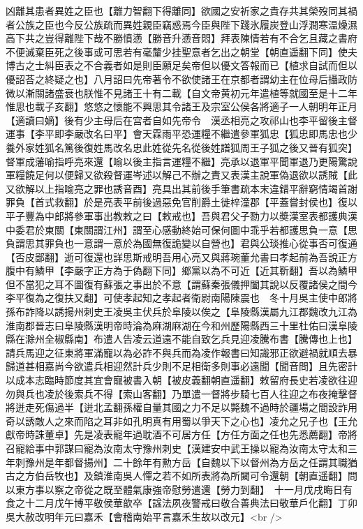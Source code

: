 凶離其患者異姓之臣也【離力智翻下得離同】欲國之安祈家之貴存共其榮歿同其禍者公族之臣也今反公族疏而異姓親臣竊惑焉今臣與陛下踐氷履炭登山浮澗寒温燥濕高下共之豈得離陛下哉不勝憤懣【勝音升懣音悶】拜表陳情若有不合乞且藏之書府不便滅棄臣死之後事或可思若有毫釐少挂聖意者乞出之朝堂【朝直遥翻下同】使夫博古之士糾臣表之不合義者如是則臣願足矣帝但以優文答報而已【植求自試而但以優詔荅之終疑之也】八月詔曰先帝著令不欲使諸王在京都者謂幼主在位母后攝政防微以漸關諸盛衰也朕惟不見諸王十有二載【自文帝黄初元年遣植等就國至是十二年惟思也載子亥翻】悠悠之懷能不興思其令諸王及宗室公侯各將適子一人朝明年正月【適讀曰嫡】後有少主母后在宫者自如先帝令　漢丞相亮之攻祁山也李平留後主督運事【李平即李嚴改名曰平】會天霖雨平恐運糧不繼遣參軍狐忠【狐忠即馬忠也少養外家姓狐名篤後復姓馬改名忠此姓從先名從後姓譜狐周王子狐之後又晉有狐突】督軍成藩喻指呼亮來還【喻以後主指言運糧不繼】亮承以退軍平聞軍退乃更陽驚說軍糧饒足何以便歸又欲殺督運岑述以解己不辦之責又表漢主說軍偽退欲以誘賊【此又欲解以上指喻亮之罪也誘音酉】亮具出其前後手筆書疏本末違錯平辭窮情竭首謝罪負【首式救翻】於是亮表平前後過惡免官削爵土徙梓潼郡【平蓋嘗封侯也】復以平子豐為中郎將參軍事出教敕之曰【敕戒也】吾與君父子勠力以奬漢室表都護典漢中委君於東關【東關謂江州】謂至心感動終始可保何圖中乖乎若都護思負一意【思負謂思其罪負也一意謂一意於為國無復詭變以自營也】君與公琰推心從事否可復通【否皮鄙翻】逝可復還也詳思斯戒明吾用心亮又與蔣琬董允書曰孝起前為吾說正方腹中有鱗甲【李嚴字正方為于偽翻下同】鄉黨以為不可近【近其靳翻】吾以為鱗甲但不當犯之耳不圖復有蘇張之事出於不意【謂蘇秦張儀押闔其說以反覆諸侯之間今李平復為之復扶又翻】可使孝起知之孝起者衛尉南陽陳震也　冬十月吳主使中郎將孫布詐降以誘揚州刺史王凌吳主伏兵於阜陵以俟之【阜陵縣漢屬九江郡魏改九江為淮南郡晉志曰阜陵縣漢明帝時淪為麻湖麻湖在今和州歷陽縣西三十里杜佑曰漢阜陵縣在滁州全椒縣南】布遣人告凌云道遠不能自致乞兵見迎凌騰布書【騰傳也上也】請兵馬迎之征東將軍滿寵以為必詐不與兵而為凌作報書曰知識邪正欲避禍就順去暴歸道甚相嘉尚今欲遣兵相迎然計兵少則不足相衛多則事必遠聞【聞音問】且先密計以成本志臨時節度其宜會寵被書入朝【被皮義翻朝直遥翻】敕留府長史若凌欲往迎勿與兵也凌於後索兵不得【索山客翻】乃單遣一督將步騎七百人往迎之布夜掩擊督將迸走死傷過半【迸北孟翻孫權自量其國之力不足以斃魏不過時於疆場之間設詐用奇以誘敵人之來而陷之耳非如孔明真有用蜀以爭天下之心也】凌允之兄子也【王允獻帝時誅董卓】先是凌表寵年過耽酒不可居方任【方任方面之任也先悉薦翻】帝將召寵給事中郭謀曰寵為汝南太守豫州刺史【漢建安中武王操以寵為汝南太守太和三年刺豫州是年都督揚州】二十餘年有勲方岳【自魏以下以督州為方岳之任謂其職猶古之方伯岳牧也】及鎮淮南吳人憚之若不如所表將為所闚可令還朝【朝直遥翻】問以東方事以察之帝從之既至體氣康強帝慰勞遣還【勞力到翻】　十一月戊戌晦日有食之十二月戊午博平敬侯華歆卒【諡法夙夜警戒曰敬合善典法曰敬華戶化翻】丁卯吳大赦改明年元曰嘉禾【會稽南始平言嘉禾生故以改元】<br />
